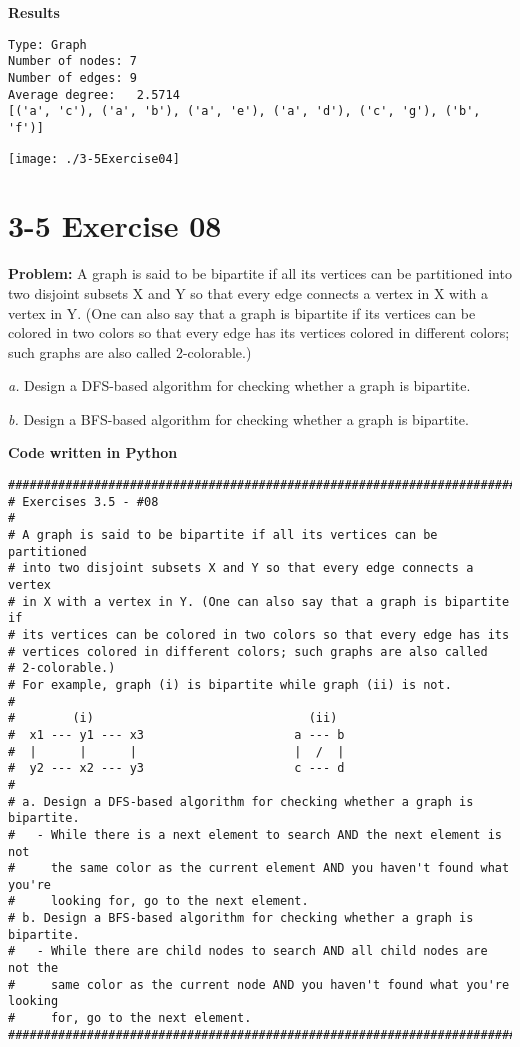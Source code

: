 \documentclass[paper=a4, fontsize=11pt]{scrartcl} %
\numberwithin{equation}{section}
\numberwithin{figure}{section}
\numberwithin{table}{section}
\begin{document}
\bigskip
\textbf{Results}
\begin{lstlisting}
Type: Graph
Number of nodes: 7
Number of edges: 9
Average degree:   2.5714
[('a', 'c'), ('a', 'b'), ('a', 'e'), ('a', 'd'), ('c', 'g'), ('b', 'f')]
\end{lstlisting}

\texttt{[image: ./3-5Exercise04]}
\pagebreak


\section{3-5 Exercise 08}

\textbf{Problem:} A graph is said to be bipartite if all its vertices can be partitioned into two disjoint subsets X and Y so that every edge connects a vertex in X with a vertex in Y. (One can also say that a graph is bipartite if its vertices can be colored in two colors so that every edge has its vertices colored in different colors; such graphs are also called 2-colorable.)

\textit{a.} Design a DFS-based algorithm for checking whether a graph is bipartite.

\textit{b.} Design a BFS-based algorithm for checking whether a graph is bipartite.

\bigskip
\textbf{Code written in Python}
\begin{lstlisting}
########################################################################
# Exercises 3.5 - #08
#
# A graph is said to be bipartite if all its vertices can be partitioned 
# into two disjoint subsets X and Y so that every edge connects a vertex
# in X with a vertex in Y. (One can also say that a graph is bipartite if 
# its vertices can be colored in two colors so that every edge has its 
# vertices colored in different colors; such graphs are also called
# 2-colorable.)
# For example, graph (i) is bipartite while graph (ii) is not.
#
#        (i)                              (ii)
#  x1 --- y1 --- x3                     a --- b
#  |      |      |                      |  /  |
#  y2 --- x2 --- y3                     c --- d
#
# a. Design a DFS-based algorithm for checking whether a graph is bipartite.
#   - While there is a next element to search AND the next element is not
#     the same color as the current element AND you haven't found what you're
#     looking for, go to the next element.
# b. Design a BFS-based algorithm for checking whether a graph is bipartite.
#   - While there are child nodes to search AND all child nodes are not the
#     same color as the current node AND you haven't found what you're looking
#     for, go to the next element.
########################################################################
\end{lstlisting}
\pagebreak
\end{document}
